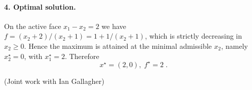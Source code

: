 \documentclass[11pt]{article}
\begin{document}
\paragraph{4.  Optimal solution.}
On the active face $x_1-x_2=2$ we have
\(f= (x_2+2)/(x_2+1)=1+1/(x_2+1)\), which is strictly
decreasing in $x_2\ge0$.  Hence the maximum is attained
at the minimal admissible $x_2$, namely $x_2^\star=0$,
with $x_1^\star=2$.  Therefore
\[
\boxed{\;x^\star=(2,0),\; f^\star=2\;}.
\]

(Joint work with Ian Gallagher)
\end{document}
